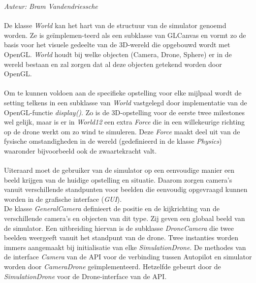 {\em Auteur: Bram Vandendriessche}
\\
\\
De klasse \textit{World} kan het hart van de structuur van de simulator genoemd worden. Ze is ge\"implemen-teerd als een subklasse van GLCanvas en vormt zo de basis voor het visuele gedeelte van de 3D-wereld die opgebouwd wordt met OpenGL. \textit{World} houdt bij welke objecten (Camera, Drone, Sphere) er in de wereld bestaan en zal zorgen dat al deze objecten getekend worden door OpenGL. 
\\
\\
Om te kunnen voldoen aan de specifieke opstelling voor elke mijlpaal wordt de setting telkens in een subklasse van \textit{World} vastgelegd door implementatie van de OpenGL-functie \textit{display()}. Zo is de 3D-opstelling voor de eerste twee milestones wel gelijk, maar is er in \textit{World12} een extra \textit{Force} die in een willekeurige richting op de drone werkt om zo wind te simuleren. Deze \textit{Force} maakt deel uit van de fysische omstandigheden in de wereld (gedefinieerd in de klasse \textit{Physics}) waaronder bijvoorbeeld ook de zwaartekracht valt. 
\\
\\
Uiteraard moet de gebruiker van de simulator op een eenvoudige manier een beeld krijgen van de huidige opstelling en situatie. Daarom zorgen camera's vanuit verschillende standpunten voor beelden die eenvoudig opgevraagd kunnen worden in de grafische interface (\textit{GUI}). \\
De klasse \textit{GeneralCamera} definieert de positie en de kijkrichting van de verschillende camera's en objecten van dit type. Zij geven een globaal beeld van de simulator. Een uitbreiding hiervan is de subklasse \textit{DroneCamera} die twee beelden weergeeft vanuit het standpunt van de drone. Twee instanties worden immers aangemaakt bij initialisatie van elke \textit{SimulationDrone}. De methodes van de interface \textit{Camera} van de API voor de verbinding tussen Autopilot en simulator worden door \textit{CameraDrone} ge\"implementeerd. Hetzelfde gebeurt door de \textit{SimulationDrone} voor de Drone-interface van de API.